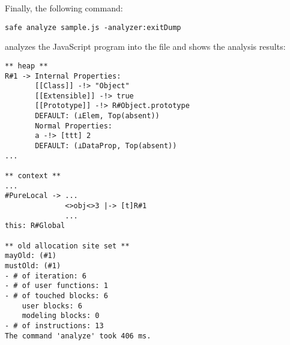 \noindent
Finally, the following command:
\begin{verbatim}
safe analyze sample.js -analyzer:exitDump
\end{verbatim}
analyzes the JavaScript program into the file and shows the analysis results:
{\small
\begin{verbatim}
** heap **
R#1 -> Internal Properties:
       [[Class]] -!> "Object"
       [[Extensible]] -!> true
       [[Prototype]] -!> R#Object.prototype
       DEFAULT: (⊥Elem, Top(absent))
       Normal Properties:
       a -!> [ttt] 2
       DEFAULT: (⊥DataProp, Top(absent))
...

** context **
...
#PureLocal -> ...
              <>obj<>3 |-> [t]R#1
              ...
this: R#Global

** old allocation site set **
mayOld: (#1)
mustOld: (#1)
- # of iteration: 6
- # of user functions: 1
- # of touched blocks: 6
    user blocks: 6
    modeling blocks: 0
- # of instructions: 13
The command 'analyze' took 406 ms.
\end{verbatim}
}
